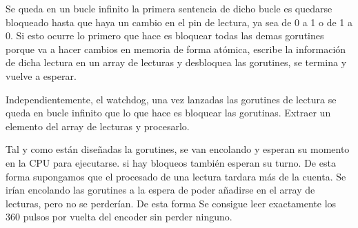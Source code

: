 Se queda en un bucle infinito la primera sentencia de dicho bucle es quedarse bloqueado hasta que haya un cambio en el pin de lectura, ya sea de 0 a 1 o de 1 a 0. Si esto ocurre lo primero que hace es bloquear todas las demas gorutines porque va a hacer cambios en memoria de forma atómica, escribe la información de dicha lectura en un array de lecturas y desbloquea las gorutines, se termina y vuelve a esperar.

Independientemente, el watchdog, una vez lanzadas las gorutines de lectura se queda en bucle infinito que lo que hace es bloquear las gorutinas. Extraer un elemento del array de lecturas y procesarlo.

Tal y como están diseñadas la gorutines, se van encolando y esperan su momento en la CPU para ejecutarse. si hay bloqueos también esperan su turno. De esta forma supongamos que el procesado de una lectura tardara más de la cuenta. Se irían encolando las gorutines a la espera de poder añadirse en el array de lecturas, pero no se perderían. De esta forma Se consigue leer exactamente los 360 pulsos por vuelta del encoder sin perder ninguno.

